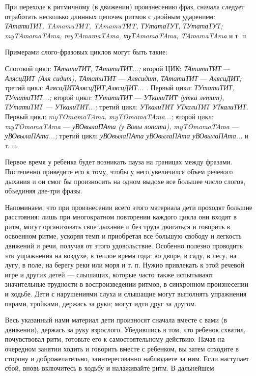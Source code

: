 \documentclass{book}
\renewcommand{\emph}[1]{\textit{#1}}
\begin{document}
При переходе к ритмичному (в движении) произнесению фраз, сначала
следует отработать несколько длинных цепочек ритмов с двойным ударением:
\emph{ТАтатиТИТ, TAmamuTИT, TAmamuTИT, ТУтатаТУТ, ТУтатаТУТ;
myTAmamaTAma, myTAmamaTAma, туТAmamaTAma, TAmamaTAma} и т. п.

Примерами слого-фразовых циклов могут быть такие:

Слоговой цикл: \emph{ТАтатиТИТ, ТАтатиТИТ...;} второй ЦИК:
\emph{ТАтатиТИТ} --- \emph{АлясиДИТ (Аля сидит), ТАтатиТИТ} ---
\emph{Алясидит, ТАтатиТИТ} --- \emph{АлясиДИТ;} третий цикл:
\emph{АлясиДИТАлясиДИТ,АлясиДИТ... .} Первый цикл: \emph{ТУтатиТИТ,
ТУтатиТИТ...;} второй цикл: \emph{ТУтатиТИТ} --- \emph{УТкалиТИТ (утка
летит), ТУтатиТИТ --- УТкалиТИТ...;} третий цикл: \emph{УТкалиТИТ
УТкалиТИТ УТкалиТИТ.} Первый цикл: \emph{myTOmamaTAma, myTOmamaTAma...;}
второй цикл: \emph{myTOmamaTAma} --- \emph{уВОвылаПАта (у Вовы лопата),
myTOmamaTAma} --- \emph{уВОвылаПАта...;} третий цикл: \emph{уВОвылаПАта
уВОвылаПАта уВОвылаПАта...} и т. п.

Первое время у ребенка будет возникать пауза на границах между фразами.
Постепенно приведите его к тому, чтобы у него увеличился объем речевого
дыхания и он смог бы произносить на одном выдохе все большее число
слогов, объединяя две-три фразы.

Напоминаем, что при произнесении всего этого материала дети проходят
большие расстояния: лишь при многократном повторении каждого цикла они
входят в ритм, могут организовать свое дыхание и без труда двигаться и
говорить в освоенном ритме, ускоряя темп и приобретая все большую
свободу и легкость движений и речи, получая от этого удовольствие.
Особенно полезно проводить эти упражнения на воздухе, в теплое время
года: во дворе, в саду, в лесу, на лугу, в поле, на берегу реки или моря
и т. п. Нужно привлекать к этой речевой игре и других детей ---
слышащих, которые часто также испытывают значительные трудности в
воспроизведении ритмов, в синхронном произнесении и ходьбе. Дети с
нарушениями слуха и слышащие могут выполнять упражнения парами,
тройками, держась за руки; могут идти друг за другом.

Весь указанный нами материал дети произносят сначала вместе с вами (в
движении), держась за руку взрослого. Убедившись в том, что ребенок
схватил, почувствовал ритм, готовьте его к самостоятельному действию.
Начав на очередном занятии ходить и говорить вместе с ребенком, вы затем
отходите в сторону и доброжелательно, заинтересованно наблюдаете за ним.
Если наступает сбой, вновь включитесь в ходьбу и налаживайте ритм. В
дальнейшем
\end{document}
